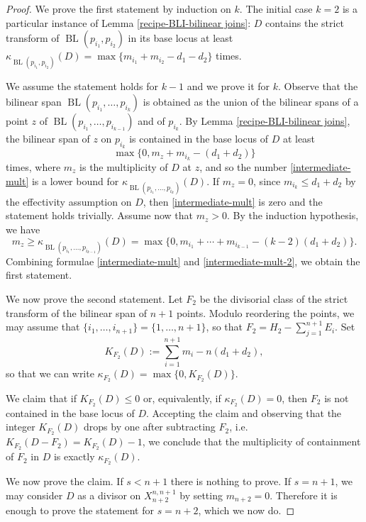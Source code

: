 \documentclass[a4paper,11pt]{article}
\newcommand{\BL}{\operatorname{BL}}
\begin{document}
\begin{proof}
We prove the first statement by induction on $k$. The initial case $k=2$ is a particular instance of Lemma \eqref{recipe-BLI-bilinear joins}: $D$ contains the strict transform of $\BL(p_{i_1},p_{i_2})$ in its base locus at least 
$\kappa_{\BL(p_{i_1},p_{i_2})}(D) =\max\{m_{i_1}+m_{i_2}-d_1-d_2\}$ times.

We assume the statement holds for $k-1$ and we prove it for $k$. 
Observe that the bilinear span $\BL(p_{i_1},\dots,p_{i_k})$ is obtained as the union of the bilinear spans of a point $z$ of $\BL(p_{i_1},\dots,p_{i_{k-1}})$ and of $p_{i_{k}}$. 
By Lemma  \ref{recipe-BLI-bilinear joins}, the bilinear span of $z$ on $p_{i_{k}}$ is contained in the base locus of $D$ at least 
\begin{equation}\label{intermediate-mult}
   \max\{0,m_{z}+m_{i_{k}}-(d_1+d_2)\} 
\end{equation}
times, where $m_z$ is the multiplicity of $D$ at $z$, and so the number \eqref{intermediate-mult} is a lower bound for $\kappa_{\BL(p_{i_1},\dots,p_{i_k})}(D)$.
If $m_z=0$, since  $m_{i_{k}}\le d_1+d_2$ by the effectivity assumption on $D$, then \eqref{intermediate-mult} is zero and the statement holds trivially. 
Assume now that $m_z>0$.
By the induction hypothesis, we have 
\begin{equation}\label{intermediate-mult-2}
m_{z}\ge \kappa_{\BL(p_{i_1},\dots,p_{i_{k-1}})}(D)=\max\{0,m_{i_1}+\cdots+m_{i_{k-1}}-(k-2)(d_1+d_2)\}.
\end{equation}
Combining formulae \eqref{intermediate-mult} and \eqref{intermediate-mult-2}, we obtain the first statement.

We now prove the second statement. Let $F_2$ be the divisorial class of the strict transform of the bilinear span of $n+1$ points. Modulo reordering the points, we may assume that $\{i_1,\dots, i_{n+1}\}=\{1,\dots, {n+1}\}$, so that $F_2=H_2-\sum_{j=1}^{n+1}E_i$. Set $$K_{F_2}(D):=\sum_{i=1}^{n+1}m_i-n(d_1+d_2),$$ so that we can write $\kappa_{F_2}(D)=\max\{0,K_{F_2}(D)\}$.

We claim that if $K_{F_2}(D)\le0$ or, equivalently, if $\kappa_{F_2}(D)=0$, then $F_2$ is not contained in the base locus of $D$.
%
Accepting the claim and observing that the integer $K_{F_2}(D)$ drops by one after subtracting $F_2$, i.e. $K_{F_2}(D-F_2)=K_{F_2}(D)-1$, we conclude that the multiplicity of containment of $F_2$ in $D$ is exactly  $\kappa_{F_2}(D)$.

We now prove the claim. If $s< n+1$
there is nothing to prove. If $s=n+1$, we may consider $D$ as a divisor on $X^{n,n+1}_{n+2}$ by setting  $m_{n+2}=0$. Therefore it is enough to prove the statement for $s=n+2$, which we now do.


\end{proof}
\end{document}
